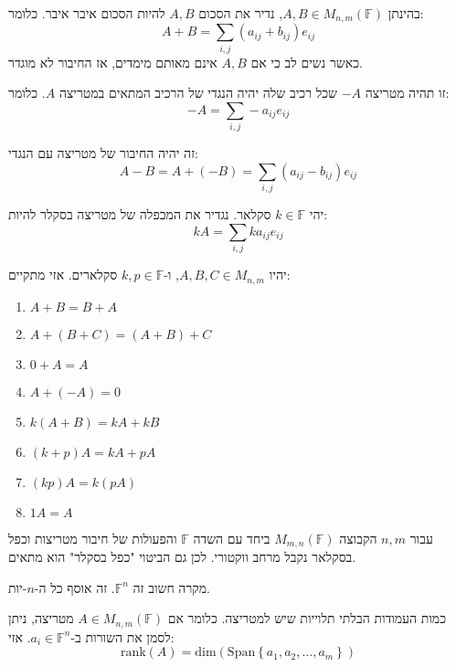 \documentclass{tstextbook}
\begin{document}
\begin{definition}
בהינתן \(A,B \in M_{n,m}\left( \mathbb{F} \right)\), נדיר את הסכום \(A,B\) להיות הסכום איבר איבר. כלומר:
$$A+B=\sum_{i,j}(a_{i j}+b_{i j})e_{ij}$$
כאשר נשים לב כי אם \(A,B\) אינם מאותם מימדים, אז החיבור לא מוגדר.

\end{definition}
\begin{definition}
זו תהיה מטריצה \(-A\) שכל רכיב שלה יהיה הנגדי של הרכיב המתאים במטריצה \(A\). כלומר:
$$-A=\sum_{i,j}-a_{i j} e_{ij}$$

\end{definition}
\begin{definition}
זה יהיה החיבור של מטריצה עם הנגדי:
$$A-B=A+(-B)=\sum_{i,j}(a_{i j}-b_{i j})e_{ij}$$

\end{definition}
\begin{definition}
יהי \(k \in \mathbb{F}\) סקלאר. נגדיר את המכפלה של מטריצה בסקלר להיות:
$$k A=\sum _{i,j}k a_{i j}e_{ij}$$

\end{definition}
\begin{proposition}
יהיו \(A,B,C\in M_{n,m}\), ו-\(k,p \in \mathbb{F}\) סקלארים. אזי מתקיים:

  \begin{enumerate}
    \item \(A+B=B+A\)


    \item \(A+(B+C)=(A+B)+C\)


    \item \(0+A=A\)


    \item \(A+(-A)=0\)


    \item \(k(A+B)=kA+kB\)


    \item \((k+p)A=kA+pA\)


    \item \((kp)A=k(pA)\)


    \item \(1A=A\)


  \end{enumerate}
\end{proposition}
\begin{corollary}
עבור \(n,m\) הקבוצה \(M_{m,n}\left( \mathbb{F}  \right)\) ביחד עם השדה \(\mathbb{F}\) והפעולות של חיבור מטריצות וכפל בסקלאר נקבל מרחב ווקטורי. לכן גם הביטוי "כפל בסקלר" הוא מתאים.

\end{corollary}
\begin{example}
מקרה חשוב זה \(\mathbb{F} ^{n}\). זה אוסף כל ה-\(n\)-יות.

\end{example}
\begin{definition}
כמות העמודות הבלתי תלוייות שיש למטריצה. כלומר אם \(A \in M_{n,m}\left( \mathbb{F}  \right)\) מטריצה, ניתן לסמן את השורות ב-\(a_{i}\in \mathbb{F} ^{n}\). אזי:
$$\mathrm{rank}(A)=\mathrm{dim}\left( \mathrm{Span}\left\{  a_{1},a_{2},\dots,a_{m}  \right\} \right)$$

\end{definition}
\end{document}
